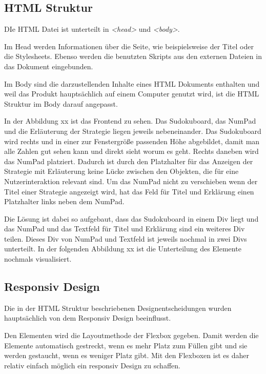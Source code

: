 \subsection{\ac{HTML} Struktur}
DIe \ac{HTML} Datei ist unterteilt in \textit{<head>} und \textit{<body>}. 

Im Head werden Informationen über die Seite, wie beispielsweise der Titel oder die Stylesheets. Ebenso werden die benutzten Skripts aus den externen Dateien in das Dokument eingebunden. 

Im Body sind die darzustellenden Inhalte eines \ac{HTML} Dokuments enthalten und weil das Produkt hauptsächlich auf einem Computer genutzt wird, ist die \ac{HTML} Struktur im Body darauf angepasst.


In der Abbildung xx ist das Frontend zu sehen. Das Sudokuboard, das NumPad und die Erläuterung der Strategie liegen jeweils nebeneinander. Das Sudokuboard wird rechts und in einer zur Fenstergröße passenden Höhe abgebildet, damit man alle Zahlen gut sehen kann und direkt sieht worum es geht. Rechts daneben wird das NumPad platziert. Dadurch ist durch den Platzhalter für das Anzeigen der Strategie mit Erläuterung keine Lücke zwischen den Objekten, die für eine Nutzerinteraktion relevant sind. Um das NumPad nicht zu verschieben wenn der Titel einer Strategie angezeigt wird, hat das Feld für Titel und Erklärung einen Platzhalter links neben dem NumPad.

Die Lösung ist dabei so aufgebaut, dass das Sudokuboard in einem Div liegt und das NumPad und das Textfeld für Titel und Erklärung sind ein weiteres Div teilen. Dieses Div von NumPad und Textfeld ist jeweils nochmal in zwei Divs unterteilt. In der folgenden Abbildung xx ist die Unterteilung des Elemente nochmals visualisiert.


\subsection{Responsiv Design}

Die in der \ac{HTML} Struktur beschriebenen Designentscheidungen wurden hauptsächlich von dem Responsiv Design beeinflusst. 

Den Elementen wird die Layoutmethode der Flexbox gegeben. Damit werden die Elemente automatisch gestreckt, wenn es mehr Platz zum Füllen gibt und sie werden gestaucht, wenn es weniger Platz gibt. Mit den Flexboxen ist es daher relativ einfach möglich ein responsiv Design zu schaffen. 

